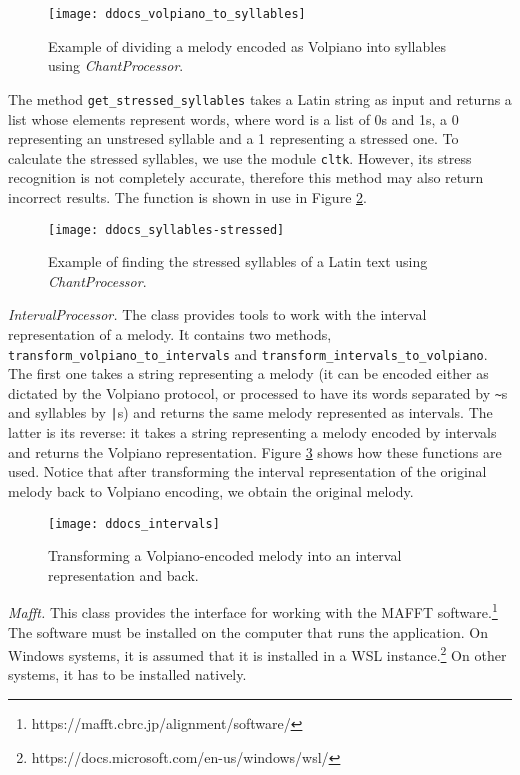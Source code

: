 \begin{figure}[!h]
\centering
\texttt{[image: ddocs\_volpiano\_to\_syllables]}
\caption{Example of dividing a melody encoded as Volpiano into syllables using \emph{ChantProcessor}.}
\label{fig:syl_volpiano}
\end{figure}

The method \verb|get_stressed_syllables| takes a Latin string as input and returns a list whose elements represent words, where word is a list of 0s and 1s,
a 0 representing an unstresed syllable and a 1 representing a stressed one. To calculate the stressed syllables, we use the module \verb|cltk|. However, 
its stress recognition is not completely accurate, therefore this method may also return incorrect results. The function is shown in use in Figure \ref{fig:syl_stress}.

\begin{figure}[!h]
\centering
\texttt{[image: ddocs\_syllables-stressed]}
\caption{Example of finding the stressed syllables of a Latin text using \emph{ChantProcessor}.}
\label{fig:syl_stress}
\end{figure}

\emph{IntervalProcessor.} The class provides tools to work with the interval representation of a melody. It contains two methods, \verb|transform_volpiano_to_intervals|
and \verb|transform_intervals_to_volpiano|. The first one takes a string representing a melody (it can be encoded either as dictated by the Volpiano protocol, or processed
to have its words separated by \verb|~|s and syllables by \verb=|=s) and returns the same melody represented as intervals. The latter is its reverse: it takes a string
representing a melody encoded by intervals and returns the Volpiano representation. Figure \ref{fig:vol_intervals} shows how these functions are used. Notice that after 
transforming the interval representation of the original melody back to Volpiano encoding, we obtain the original melody.

\begin{figure}[!h]
\centering
\texttt{[image: ddocs\_intervals]}
\caption{Transforming a Volpiano-encoded melody into an interval representation and back.}
\label{fig:vol_intervals}
\end{figure}

\emph{Mafft.} This class provides the interface for working with the MAFFT software.\footnote{https://mafft.cbrc.jp/alignment/software/} The software must be installed
on the computer that runs the application. On Windows systems, it is assumed that it is installed in a WSL instance.\footnote{https://docs.microsoft.com/en-us/windows/wsl/}
On other systems, it has to be installed natively.

